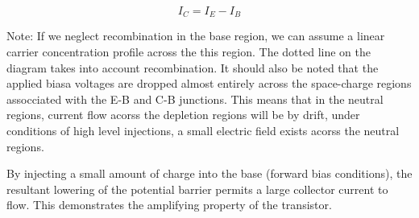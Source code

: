 \documentclass[a4paper,12pt]{article}
\begin{document}
\[ I_{C} = I_{E} - I_{B} \]

Note: If we neglect recombination in the base region, we can
assume a linear carrier concentration profile across the this region.
The dotted line on the diagram takes into account recombination. It
should also be noted that the applied biasa voltages are dropped almost
entirely across the space-charge regions assocciated with the E-B and
C-B junctions. This means that in the neutral regions, current flow
acorss the depletion regions will be by drift, under conditions of high
level injections, a small electric field exists acorss the neutral
regions.

By injecting a small amount of charge into the base (forward
bias conditions), the resultant lowering of the potential barrier
permits a large collector current to flow. This demonstrates the
amplifying property of the transistor.

\end{document}
